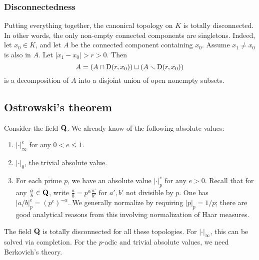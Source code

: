 \subsubsection{Disconnectedness}
Putting everything together, the canonical topology on $K$ is totally 
disconnected. In other words, the only non-empty connected components are 
singletons. Indeed, let $x_0\in K$, and let $A$ be the connected component 
containing $x_0$. Assume $x_1\ne x_0$ is also in $A$. Let 
$|x_1-x_0|>r>0$. Then 
\[
  A = \left(A\cap \operatorname{D}(r,x_0)\right) \sqcup \left(A\smallsetminus \operatorname{D}(r,x_0)\right) 
\]
is a decomposition of $A$ into a disjoint union of open nonempty subsets. 





\subsection{Ostrowski's theorem}

Consider the field $\mathbf{Q}$. We already know of the following absolute values: 
\begin{enumerate}
\item
$|\cdot|_\infty^e$ for any $0<e\leqslant 1$.

\item 
$|\cdot|_0$, the trivial absolute value.

\item 
For each prime $p$, we have an absolute value $|\cdot|_p^e$ for any $e>0$. Recall 
that for any $\frac a b\in \mathbf{Q}$, write $\frac a b=p^\alpha \frac{a'}{b'}$ for 
$a',b'$ not divisible by $p$. One has $|a/b|_p^e = (p^e)^{-\alpha}$. We 
generally normalize by requiring $|p|_p = 1/p$; there are good analytical 
reasons from this involving normalization of Haar measures. 
\end{enumerate}

The field $\mathbf{Q}$ is totally disconnected for all these topologies. For 
$|\cdot|_\infty$, this can be solved via completion. For the $p$-adic and 
trivial absolute values, we need Berkovich's theory. 

